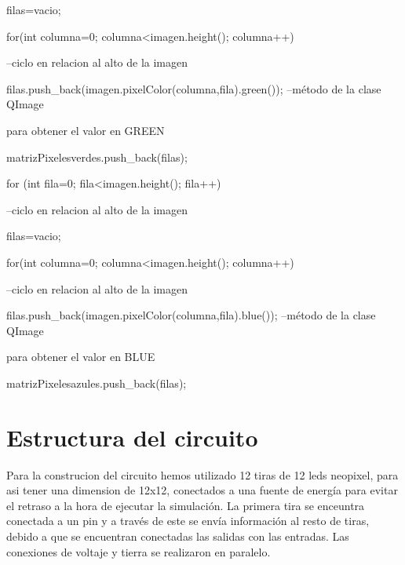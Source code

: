 \documentclass{article}
\begin{document}
\begin{itemize}
{\hspace{1cm}filas=vacio;

\hspace{1cm}for(int columna=0; columna<imagen.height(); columna++){ --ciclo en relacion al alto de la imagen

\hspace{1.5cm}filas.push_back(imagen.pixelColor(columna,fila).green()); --método de la clase QImage 

para obtener el valor en GREEN

\hspace{1cm}}

\hspace{1cm}matrizPixelesverdes.push_back(filas);

\hspace{0.5cm}}

\hspace{0.5cm}for (int fila=0; fila<imagen.height(); fila++){ --ciclo en relacion al alto de la imagen

\hspace{1cm}filas=vacio;

\hspace{1cm}for(int columna=0; columna<imagen.height(); columna++){ --ciclo en relacion al alto de la imagen

\hspace{1.5cm}filas.push_back(imagen.pixelColor(columna,fila).blue()); --método de la clase QImage 

para obtener el valor en BLUE

\hspace{1cm}}

\hspace{1cm}matrizPixelesazules.push_back(filas);

\hspace{0.5cm}}



\end{itemize}

\section{Estructura del circuito}

Para la construcion del circuito hemos utilizado 12 tiras de 12 leds neopixel, para asi tener una dimension de 12x12, conectados a una fuente de energía para evitar el retraso a la hora de ejecutar la simulación. La primera tira se enceuntra conectada a un pin y a través de este se envía información al resto de tiras, debido a que se encuentran conectadas las salidas con las entradas. Las conexiones de voltaje y tierra se realizaron en paralelo.
\end{document}
